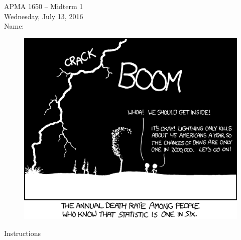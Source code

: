 \documentclass[12pt]{article}
\begin{document}
\title{}
\author{\vspace{-10ex} }

\begin{center}
{\LARGE APMA 1650 -- Midterm 1}\\
\vspace{5mm}
{\large Wednesday, July 13, 2016 }\\
\vspace{10mm}
{\large Name: }
\vspace{3cm}

\begin{figure}[H]
\centering
\includegraphics[width=15cm]{xkcd1}
\end{figure}
\end{center}
\pagebreak

\begin{center}
{\LARGE Instructions}\\
\vspace{5mm}
\end{center}
\end{document}
